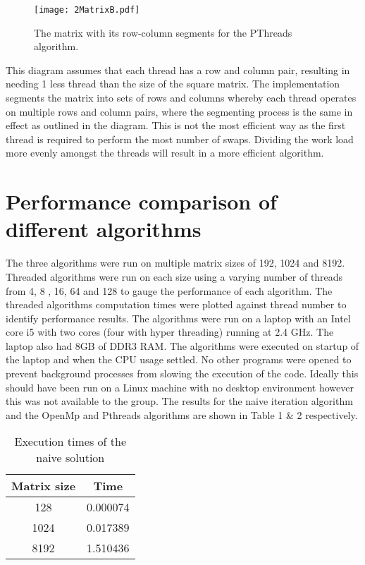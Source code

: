 \documentclass[10pt,onecolumn]{article}
\begin{document}
    \begin{figure}[h!]
    \centering
    \texttt{[image: 2MatrixB.pdf]}
    \centering
    \caption{The matrix with its row-column segments for the PThreads algorithm.}
    \end{figure}
    
    \noindent This diagram assumes that each thread has a row and column pair, resulting in needing 1 less thread than the size of the square matrix. The implementation segments the matrix into sets of rows and columns whereby each thread operates on multiple rows and column pairs, where the segmenting process is the same in effect as outlined in the diagram. This is not the most efficient way as the first thread is required to perform the most number of swaps. Dividing the work load more evenly amongst the threads will result in a more efficient algorithm. 
    
    \section{Performance comparison of different algorithms}
    The three algorithms were run on multiple matrix sizes of 192, 1024 and 8192. Threaded algorithms were run on each size using a varying number of threads from 4, 8 , 16, 64 and 128 to gauge the performance of each algorithm. The threaded algorithms computation times were plotted against thread number to identify performance results. The algorithms were run on a laptop with an Intel core i5 with two cores (four with hyper threading) running at 2.4 GHz. The laptop also had 8GB of DDR3 RAM. The algorithms were executed on startup of the laptop and when the CPU usage settled. No other programs were opened to prevent background processes from slowing the execution of the code. Ideally this should have been run on a Linux machine with no desktop environment however this was not available to the group. The results for the naive iteration algorithm and the OpenMp and Pthreads algorithms are shown in Table 1 \& 2 respectively.
    
    \begin{table}[htpb!]
    \centering
    \caption{Execution times of the naive solution}
    \label{my-label}
    \begin{tabular}{|c|c|}
    \hline
    \textbf{Matrix size} & \textbf{Time} \\ \hline
    128                  & 0.000074      \\ \hline
    1024                 & 0.017389      \\ \hline
    8192                 & 1.510436      \\ \hline
    \end{tabular}
    \end{table}
    
\end{document}
